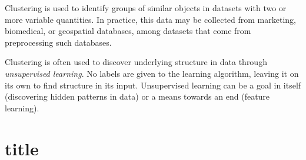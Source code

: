 Clustering is used to identify groups of similar objects in datasets with two or more variable quantities. In practice, this data may be collected from marketing, biomedical, or geospatial databases, among datasets that come from preprocessing such databases.

Clustering is often used to discover underlying structure in data through \textit{unsupervised learning}. No labels are given to the learning algorithm, leaving it on its own to find structure in its input. Unsupervised learning can be a goal in itself (discovering hidden patterns in data) or a means towards an end (feature learning). 

\section{title}

